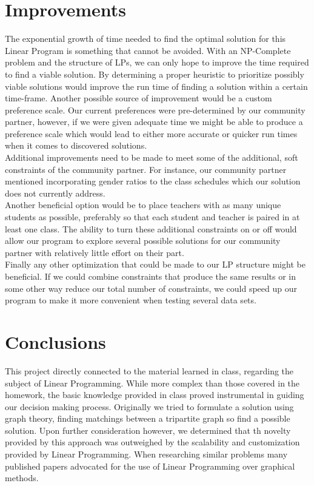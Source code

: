 \documentclass[11pt]{article}
\begin{document}
\section{Improvements}
The exponential growth of time needed to find the optimal solution for this Linear Program is something that cannot be avoided. With an NP-Complete problem and the structure of LPs, we can only hope to improve the time required to find a viable solution. By determining a proper heuristic to prioritize possibly viable solutions would improve the run time of finding a solution within a certain time-frame. Another possible source of improvement would be a custom preference scale. Our current preferences were pre-determined by our community partner, however, if we were given adequate time we might be able to produce a preference scale which would lead to either more accurate or quicker run times when it comes to discovered solutions.\\
\indent Additional improvements need to be made to meet some of the additional, soft constraints of the community partner. For instance, our community partner mentioned incorporating gender ratios to the class schedules which our solution does not currently address.\\
\indent Another beneficial option would be to place teachers with as many unique students as possible, preferably so that each student and teacher is paired in at least one class. The ability to turn these additional constraints on or off would allow our program to explore several possible solutions for our community partner with relatively little effort on their part.\\
\indent Finally any other optimization that could be made to our LP structure might be beneficial. If we could combine constraints that produce the same results or in some other way reduce our total number of constraints, we could speed up our program to make it more convenient when testing several data sets.

\section{Conclusions}
This project directly connected to the material learned in class, regarding the subject of Linear Programming. While more complex than those covered in the homework, the basic knowledge provided in class proved instrumental in guiding our decision making process. Originally we tried to formulate a solution using graph theory, finding matchings between a tripartite graph so find a possible solution. Upon further consideration however, we determined that th novelty provided by this approach was outweighed by the scalability and customization provided by Linear Programming. When researching similar problems many published papers advocated for the use of Linear Programming over graphical methods.
\end{document}
